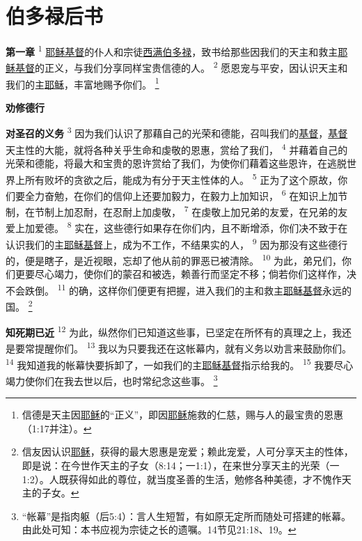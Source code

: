 \chapter*{伯多禄后书}


\textbf{第一章\quad}
\textsuperscript{1}
\uline{耶稣}\uline{基督}的仆人和宗徒\uline{西满}\uline{伯多禄}，致书给那些因我们的天主和救主\uline{耶稣}\uline{基督}的正义，与我们分享同样宝贵信德的人。
\textsuperscript{2}
愿恩宠与平安，因认识天主和我们的主\uline{耶稣}，丰富地赐予你们。
\footnote{信德是天主因\uline{耶稣}的“正义”，即因\uline{耶稣}施救的仁慈，赐与人的最宝贵的恩惠（1:17并注）。}

\begin{center}
	\textbf{\large{\songti 劝修德行}}
\end{center}

\textbf{对圣召的义务\quad}
\textsuperscript{3}
因为我们认识了那藉自己的光荣和德能，召叫我们的\uline{基督}，\uline{基督}天主性的大能，就将各种关乎生命和虔敬的恩惠，赏给了我们，
\textsuperscript{4}
并藉着自己的光荣和德能，将最大和宝贵的恩许赏给了我们，为使你们藉着这些恩许，在逃脱世界上所有败坏的贪欲之后，能成为有分于天主性体的人。
\textsuperscript{5}
正为了这个原故，你们要全力奋勉，在你们的信仰上还要加毅力，在毅力上加知识，
\textsuperscript{6}
在知识上加节制，在节制上加忍耐，在忍耐上加虔敬，
\textsuperscript{7}
在虔敬上加兄弟的友爱，在兄弟的友爱上加爱德。
\textsuperscript{8}
实在，这些德行如果存在你们内，且不断增添，你们决不致于在认识我们的主\uline{耶稣}\uline{基督}上，成为不工作，不结果实的人，
\textsuperscript{9}
因为那没有这些德行的，便是瞎子，是近视眼，忘却了他从前的罪恶已被清除。
\textsuperscript{10}
为此，弟兄们，你们更要尽心竭力，使你们的蒙召和被选，赖善行而坚定不移；倘若你们这样作，决不会跌倒。
\textsuperscript{11}
的确，这样你们便更有把握，进入我们的主和救主\uline{耶稣}\uline{基督}永远的国。
\footnote{信友因认识\uline{耶稣}，获得的最大恩惠是宠爱；赖此宠爱，人可分享天主的性体，即是说：在今世作天主的子女（8:14；一1:1），在来世分享天主的光荣（一1:2）。人既获得如此的尊位，就当度圣善的生活，勉修各种美德，才不愧作天主的子女。}

\textbf{知死期已近\quad}
\textsuperscript{12}
为此，纵然你们已知道这些事，已坚定在所怀有的真理之上，我还是要常提醒你们。
\textsuperscript{13}
我以为只要我还在这帐幕内，就有义务以劝言来鼓励你们。
\textsuperscript{14}
我知道我的帐幕快要拆卸了，一如我们的主\uline{耶稣}\uline{基督}指示给我的。
\textsuperscript{15}
我要尽心竭力使你们在我去世以后，也时常纪念这些事。
\footnote{“帐幕”是指肉躯（后5:4）：言人生短暂，有如原无定所而随处可搭建的帐幕。由此处可知：本书应视为宗徒之长的遗嘱。14节见21:18、19。}

